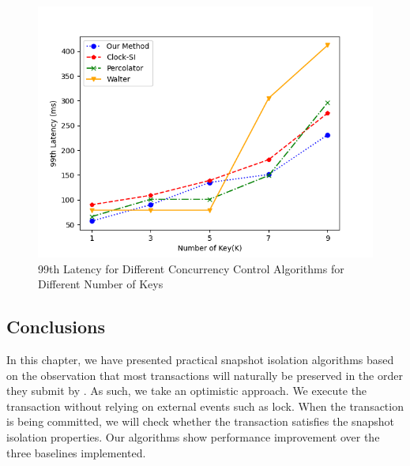 \begin{figure}[H]
    \centering
    \includegraphics[width=0.8\linewidth]{figure/48.png}
    \caption{99th Latency for Different Concurrency Control Algorithms for Different Number of Keys}
    \label{fig:48}
\end{figure}




\subsection{Conclusions}
In this chapter, we have presented practical snapshot isolation algorithms based on the observation that most transactions will naturally be preserved in the order they submit by \cite{lu2023ncc}. As such, we take an optimistic approach. We execute the transaction without relying on external events such as lock. When the transaction is being committed, we will check whether the transaction satisfies the snapshot isolation properties. Our algorithms show  performance improvement over the three baselines implemented.
